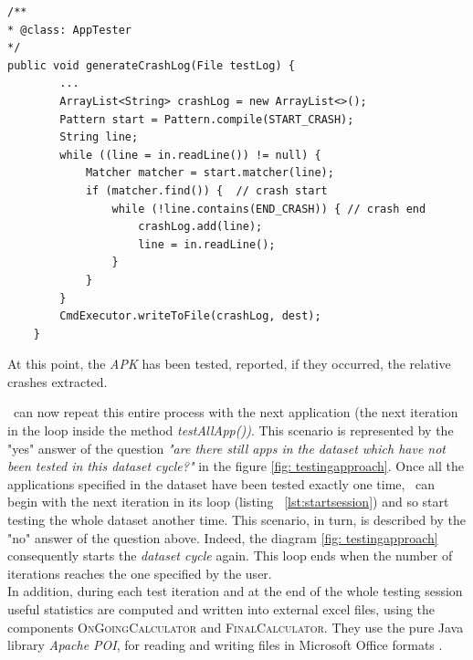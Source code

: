 \begin{lstlisting}[caption=\AppTester's method for extracting a crash log from its test log,label={lst:generatecrash}]
/**
* @class: AppTester
*/
public void generateCrashLog(File testLog) {
        ...
        ArrayList<String> crashLog = new ArrayList<>();
        Pattern start = Pattern.compile(START_CRASH);
        String line;
        while ((line = in.readLine()) != null) {
            Matcher matcher = start.matcher(line);
            if (matcher.find()) {  // crash start
                while (!line.contains(END_CRASH)) { // crash end
                    crashLog.add(line);
                    line = in.readLine();
                }
            }
        }
        CmdExecutor.writeToFile(crashLog, dest);
    }
\end{lstlisting} 
At this point, the \textit{APK} has been tested, reported, if they occurred, the relative crashes extracted.



\toolname\ can now repeat this entire process with the next application (\ie the next iteration in the loop inside the method \textit{testAllApp())}. This scenario is represented by the "yes" answer of the question \textit{"are there still apps in the dataset which have not been tested in this dataset cycle?"} in the figure \ref{fig: testingapproach}.
Once all the applications specified in the dataset have been tested exactly one time, \SessionLauncher\ can begin with the next iteration in its loop (listing ~\ref{lst:startsession}) and so start testing the whole dataset another time. 
This scenario, in turn, is described by the "no" answer of the question above. Indeed, the diagram \ref{fig: testingapproach} consequently starts the \textit{dataset cycle} again. 
This loop ends when the number of iterations reaches the one specified by the user. \\
In addition, during each test iteration and at the end of the whole testing session useful statistics are computed and written into external excel files, using the components \textsc{OnGoingCalculator} and \textsc{FinalCalculator}. They use the pure Java library \textit{Apache POI}, for reading and writing files in Microsoft Office formats \cite{apachepoi}. 




